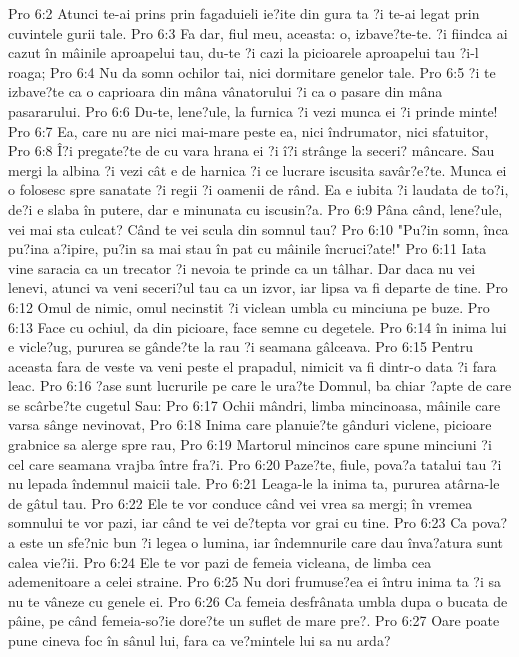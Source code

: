 Pro 6:2  Atunci te-ai prins prin fagaduieli ie?ite din gura ta ?i te-ai legat prin cuvintele gurii tale.
Pro 6:3  Fa dar, fiul meu, aceasta: o, izbave?te-te. ?i fiindca ai cazut în mâinile aproapelui tau, du-te ?i cazi la picioarele aproapelui tau ?i-l roaga;
Pro 6:4  Nu da somn ochilor tai, nici dormitare genelor tale.
Pro 6:5  ?i te izbave?te ca o caprioara din mâna vânatorului ?i ca o pasare din mâna pasararului.
Pro 6:6  Du-te, lene?ule, la furnica ?i vezi munca ei ?i prinde minte!
Pro 6:7  Ea, care nu are nici mai-mare peste ea, nici îndrumator, nici sfatuitor,
Pro 6:8  Î?i pregate?te de cu vara hrana ei ?i î?i strânge la seceri? mâncare. Sau mergi la albina ?i vezi cât e de harnica ?i ce lucrare iscusita savâr?e?te. Munca ei o folosesc spre sanatate ?i regii ?i oamenii de rând. Ea e iubita ?i laudata de to?i, de?i e slaba în putere, dar e minunata cu iscusin?a.
Pro 6:9  Pâna când, lene?ule, vei mai sta culcat? Când te vei scula din somnul tau?
Pro 6:10  "Pu?in somn, înca pu?ina a?ipire, pu?in sa mai stau în pat cu mâinile încruci?ate!"
Pro 6:11  Iata vine saracia ca un trecator ?i nevoia te prinde ca un tâlhar. Dar daca nu vei lenevi, atunci va veni seceri?ul tau ca un izvor, iar lipsa va fi departe de tine.
Pro 6:12  Omul de nimic, omul necinstit ?i viclean umbla cu minciuna pe buze.
Pro 6:13  Face cu ochiul, da din picioare, face semne cu degetele.
Pro 6:14  în inima lui e vicle?ug, pururea se gânde?te la rau ?i seamana gâlceava.
Pro 6:15  Pentru aceasta fara de veste va veni peste el prapadul, nimicit va fi dintr-o data ?i fara leac.
Pro 6:16  ?ase sunt lucrurile pe care le ura?te Domnul, ba chiar ?apte de care se scârbe?te cugetul Sau:
Pro 6:17  Ochii mândri, limba mincinoasa, mâinile care varsa sânge nevinovat,
Pro 6:18  Inima care planuie?te gânduri viclene, picioare grabnice sa alerge spre rau,
Pro 6:19  Martorul mincinos care spune minciuni ?i cel care seamana vrajba între fra?i.
Pro 6:20  Paze?te, fiule, pova?a tatalui tau ?i nu lepada îndemnul maicii tale.
Pro 6:21  Leaga-le la inima ta, pururea atârna-le de gâtul tau.
Pro 6:22  Ele te vor conduce când vei vrea sa mergi; în vremea somnului te vor pazi, iar când te vei de?tepta vor grai cu tine.
Pro 6:23  Ca pova?a este un sfe?nic bun ?i legea o lumina, iar îndemnurile care dau înva?atura sunt calea vie?ii.
Pro 6:24  Ele te vor pazi de femeia vicleana, de limba cea ademenitoare a celei straine.
Pro 6:25  Nu dori frumuse?ea ei întru inima ta ?i sa nu te vâneze cu genele ei.
Pro 6:26  Ca femeia desfrânata umbla dupa o bucata de pâine, pe când femeia-so?ie dore?te un suflet de mare pre?.
Pro 6:27  Oare poate pune cineva foc în sânul lui, fara ca ve?mintele lui sa nu arda?
